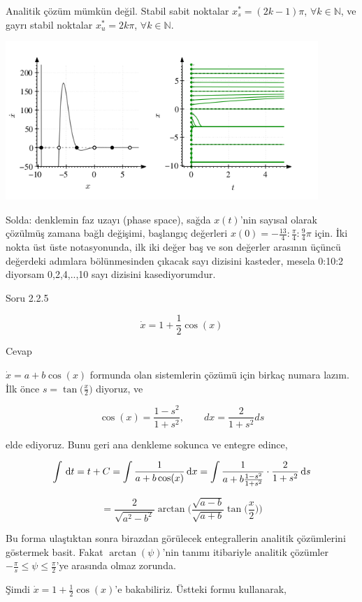 \documentclass[12pt,fleqn]{article}\usepackage{../../common}
\begin{document}
Analitik çözüm mümkün değil. Stabil sabit noktalar $x^*_s = (2k-1)\pi$, $\forall
k \in \mathbb{N}$, ve gayrı stabil noktalar $x^*_u = 2k\pi$, $\forall k \in
\mathbb{N}$.

\includegraphics[height=6cm]{03_10.png}

Solda: denklemin faz uzayı (phase space), sağda $x(t)$'nin sayısal olarak
çözülmüş zamana bağlı değişimi, başlangıç değerleri $x(0) =
-\frac{13}{4}:\frac{\pi}{4}:\frac{9}{4}\pi$ için. İki nokta üst üste
notasyonunda, ilk iki değer baş ve son değerler arasının üçüncü değerdeki adımlara
bölünmesinden çıkacak sayı dizisini kasteder, mesela 0:10:2 diyorsam 0,2,4,..,10
sayı dizisini kasediyorumdur. 

Soru 2.2.5

$$\dot{x} = 1 + \frac{1}{2} \cos(x)$$

Cevap

$\dot{x} = a + b \cos(x)$ formunda olan sistemlerin çözümü için birkaç numara
lazım. İlk önce $s = \tan\big(\frac{x}{2}\big)$ diyoruz, ve

$$ \cos(x) = \frac{1-s^2}{1+s^2}, \qquad dx = \frac{2}{1+s^2}ds $$

elde ediyoruz. Bunu geri ana denkleme sokunca ve entegre edince,

$$ \int \,\mathrm{d} t = t + C = \int \frac{1}{a+b\cos(x)} \,\mathrm{d} x =
\int \frac{1}{a + b \frac{1-s^2}{1+s^2}} \cdot \frac{2}{1+s^2} \,\mathrm{d} s
$$

$$ =
\frac{2}{\sqrt{a^2-b^2}} \arctan
\bigg( \frac{\sqrt{a-b}}{\sqrt{a+b}} \tan \bigg( \frac{x}{2} \bigg) \bigg)
$$

Bu forma ulaştıktan sonra birazdan görülecek entegrallerin analitik çözümlerini
göstermek basit. Fakat $\arctan(\psi)$'nin tanımı itibariyle analitik çözümler
$-\frac{\pi}{s} \le \psi \le \frac{\pi}{2}$'ye arasında olmaz zorunda.

Şimdi $\dot{x} = 1 + \frac{1}{2} \cos(x)$'e bakabiliriz. Üstteki formu
kullanarak,
\end{document}
